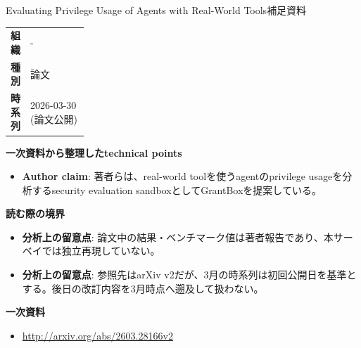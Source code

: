 \begin{technicalnote}{Evaluating Privilege Usage of Agents with Real-World Tools}{補足資料}
\begingroup
\begin{tabularx}{\linewidth}{@{}>{\bfseries}p{0.22\linewidth}X@{}}
組織 & - \\
種別 & 論文 \\
時系列 & 2026-03-30 (論文公開) \\
\end{tabularx}
\smallskip
{\bfseries 一次資料から整理したtechnical points}
\begin{itemize}[leftmargin=1.5em,itemsep=0.35em]
\item \textbf{Author claim}: 著者らは、real-world toolを使うagentのprivilege usageを分析するsecurity evaluation sandboxとしてGrantBoxを提案している。
\end{itemize}
\begin{minipage}{\linewidth}
{\bfseries 読む際の境界}
\begin{itemize}[leftmargin=1.5em,itemsep=0.35em]
\item \textbf{分析上の留意点}: 論文中の結果・ベンチマーク値は著者報告であり、本サーベイでは独立再現していない。
\item \textbf{分析上の留意点}: 参照先はarXiv v2だが、3月の時系列は初回公開日を基準とする。後日の改訂内容を3月時点へ遡及して扱わない。
\end{itemize}
\begin{samepage}
{\bfseries 一次資料}
\begingroup\sloppy
\begin{itemize}[leftmargin=1.5em,itemsep=0.25em]
\item {\scriptsize\url{http://arxiv.org/abs/2603.28166v2}}
\end{itemize}
\endgroup
\end{samepage}
\end{minipage}
\endgroup
\end{technicalnote}
\medskip

